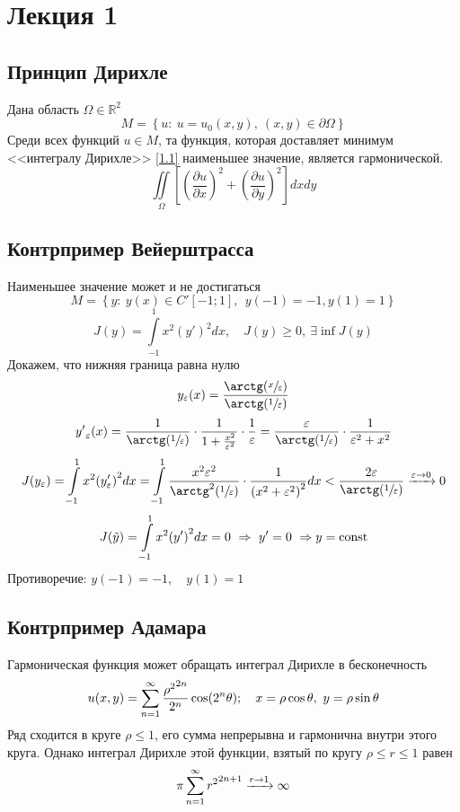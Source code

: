 \section{Лекция 1}

\subsection{Принцип Дирихле}

Дана область $ \Omega \in \mathbb{R}^2$
\[
M = \left\{ u: \ u = u_0(x,y), \ (x,y) \in \partial \Omega \right\}
\]
Среди всех функций \( u \in M \), та функция, которая доставляет минимум <<интегралу Дирихле>> \eqref{1.1} наименьшее значение, является гармонической.
\[
\iint\limits_{\Omega}\left[{\left(\frac{\partial u}{\partial x}\right)}^2+{\left(\frac{\partial u}{\partial y}\right)}^2\right] dx dy
\tag{1.1}
\label{1.1}
\]

\subsection{Контрпример Вейерштрасса}

Наименьшее значение может и не достигаться
\[
M = \left\{ y: \ y(x) \in C'[-1;1], \ \ y(-1)=-1, y(1)=1 \right\}
\]
\[
J(y) = \int\limits^1_{-1} x^2{(y')}^2 dx, \quad J(y) \geq 0, \ \exists \inf J(y)
\]
Докажем, что нижняя граница равна нулю
\[
y_\varepsilon(x) = \frac{\arctg(\sfrac{x}{\varepsilon})}{\arctg(\sfrac{1}{\varepsilon})}
\]
\[
{y'}_{\varepsilon}(x) = \frac{1}{\arctg(\sfrac{1}{\varepsilon})} \cdot \frac{1}{1+ \frac{x^2}{\varepsilon^2}} \cdot \frac{1}{\varepsilon} = \frac{\varepsilon} {\arctg (\sfrac{1}{\varepsilon})} \cdot \frac{1}{\varepsilon^2+x^2}
\]
\[
J(y_{\varepsilon}) = \int\limits^1_{-1} x^2{(y_{\varepsilon}')}^2 dx = \int\limits_{-1}^1 \frac{x^2 \varepsilon^2}{\arctg^2(\sfrac{1}{\varepsilon})} \cdot \frac{1}{{(x^2+\varepsilon^2)}^2} dx < \frac{2 \varepsilon}{\arctg(\sfrac{1}{\varepsilon})} \xrightarrow{\varepsilon \rightarrow 0} 0
\]
\[
J(\tilde{y}) = \int\limits^1_{-1} x^2{(y')}^2 dx = 0 \ \Rightarrow \ y'=0 \ \Rightarrow y = \operatorname{const}
\]
Противоречие: \( y(-1)=-1, \quad y(1)=1 \)

\subsection{Контрпример Адамара}

Гармоническая функция может обращать интеграл Дирихле в бесконечность
\[
u(x,y) = \sum\limits_{n=1}^{\infty}\frac{{\rho^2}^{2n}}{2^n} \cos(2^n \theta); \quad x=\rho \cos \theta, \ y=\rho \sin \theta
\]
Ряд сходится в круге $\rho \leq 1$, его сумма непрерывна и гармонична внутри этого круга. Однако интеграл Дирихле этой функции, взятый по кругу $ \rho \leq r \leq 1 $ равен
\[
\pi \sum\limits_{n=1}^{\infty} {r^2}^{2n+1} \xrightarrow{r \rightarrow 1} \infty
\]

